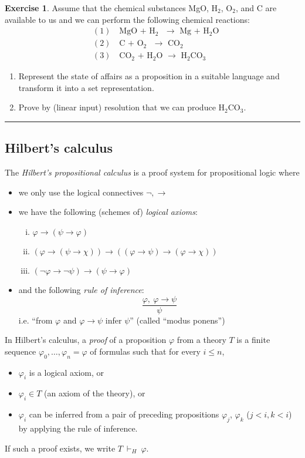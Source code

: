 \documentclass{amsart}
\theoremstyle{definition}
\newtheorem{problem}{Exercise}
\begin{document}
\begin{problem}Assume that the chemical substances MgO, H$_2$, O$_2$, and C are available to us and we can perform the following chemical reactions:
\begin{align*}&(1)\quad\text{MgO\ +\ H$_2$\ \ $\to$\ \ Mg\ +\ H$_2$O}\\
&(2)\quad\text{C\ +\ O$_2$\ \ $\to$\ \ CO$_2$}\\
&(3)\quad\text{CO$_2$\ +\ H$_2$O\ \ $\to$\ \ H$_2$CO$_3$}
\end{align*}
\begin{enumerate}
\item Represent the state of affairs as a proposition in a suitable language and transform it into a set representation.
\item Prove by (linear input) resolution that we can produce H$_2$CO$_3$.
\end{enumerate}
\end{problem}\medskip


\bigskip \hrule

\subsection*{Hilbert's calculus}
The \emph{Hilbert's propositional calculus} is a proof system for propositional logic where 
\begin{itemize}
    \item we only use the logical connectives $\neg,\to$
    \item we have the following (schemes of) \emph{logical axioms}:
    \begin{enumerate}[(i)]
        \item $\varphi \to (\psi \to \varphi)$
        \item $(\varphi\to (\psi \to \chi)) \to ((\varphi \to \psi)\to(\varphi \to \chi))$
        \item $(\neg \varphi \to \neg \psi)\to(\psi \to \varphi)$
    \end{enumerate}
    \item and the following \emph{rule of inference}:
    $$\frac{\varphi,\ \varphi \to \psi}{\psi}$$
    i.e. ``from $\varphi$ and $\varphi\to\psi$ infer $\psi$'' (called ``modus ponens'')
\end{itemize}
In Hilbert's calculus, a \emph{proof} of a proposition $\varphi$ from a theory $T$ is a finite sequence $\varphi_0,\dots,\varphi_n=\varphi$ of formulas such that for every $i\leq n$,
\begin{itemize}
\item $\varphi_i$ is a logical axiom, or 
\item $\varphi_i \in T$ (an axiom of the theory), or
\item $\varphi_i$ can be inferred from a pair of preceding propositions $\varphi_j$, $\varphi_k$ ($j<i,k<i$) by applying the rule of inference.
\end{itemize}
If such a proof exists, we write $T\ \vdash_H\ \varphi$.
\end{document}

